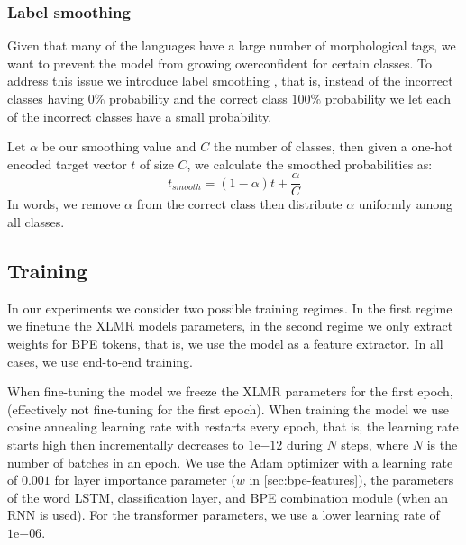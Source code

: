 \documentclass[11pt]{article}
\newcommand\jp[1]{(\textbf{JP:} #1)}
\begin{document}
	\subsubsection{Label smoothing}
    	Given that many of the languages have a large number of
     morphological tags, we want to prevent the model from growing
     overconfident for certain classes. To address this issue we
     introduce label smoothing \cite{szegedy2016rethinking}, that is,
     instead of the incorrect classes having $0\%$ probability and the
     correct class $100\%$ probability we let each of the incorrect
     classes have a small probability.


     Let $\alpha$ be our smoothing value and $C$ the number of
     classes, then given a one-hot encoded target vector $t$ of size
     $C$, we calculate the smoothed probabilities as:
    \begin{equation}
        t_{smooth} = (1-\alpha)t + \frac{\alpha}{C}
    \end{equation}
    In words, we remove $\alpha$ from the correct class then
    distribute $\alpha$ uniformly among all classes.

     \subsection{Training}

	
     In our experiments we consider two possible training regimes. In
     the first regime we finetune the XLMR models parameters, in the
     second regime we only extract weights for BPE tokens, that is, we
     use the model as a feature extractor. In all cases, we use
     end-to-end training.
     
     When fine-tuning the model we freeze the XLMR parameters for the
     first epoch, (effectively not fine-tuning for the first epoch).
     When training the model we use cosine annealing learning rate
     with restarts every epoch, that is, the learning rate starts high
     then incrementally decreases to $1\mathrm{e}{-12}$ during $N$
     steps, where $N$ is the number of batches in an epoch. We use the
     Adam optimizer with a learning rate of $0.001$ for layer
     importance parameter ($w$ in \cref{sec:bpe-features}), the
     parameters of the word LSTM, classification layer, and BPE
     combination module (when an RNN is used). For the transformer
     parameters, we use a lower learning rate of $1\mathrm{e}{-06}$.
\end{document}
